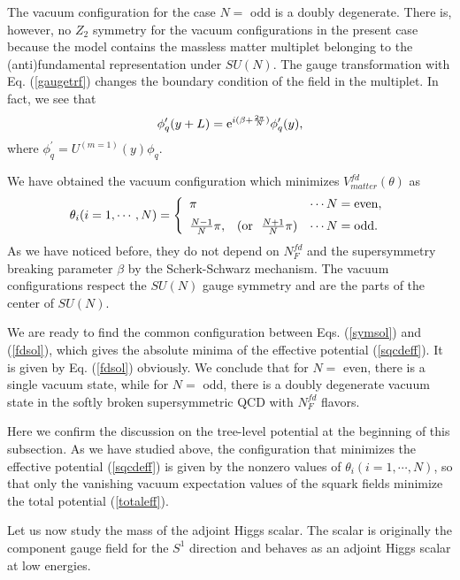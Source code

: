 \documentclass[a4paper,12pt]{article}
\begin{document}
The vacuum configuration for the case $N=$ odd is a doubly degenerate.
There is, however, no $Z_2$ symmetry for the vacuum configurations in
the present case because the model contains the massless matter 
multiplet belonging to the (anti)fundamental
representation under $SU(N)$. The gauge transformation 
with Eq. (\ref{gaugetrf})
changes the boundary condition of the field in the multiplet. 
In fact, we see that 
\begin{equation}
\phi_q^{\prime}(y+L)={\rm e}^{i(\beta+{{2\pi}\over N})}\phi_q^{\prime}(y),
\end{equation}
where $\phi_q^{\prime}=U^{(m=1)}(y)\phi_q$.
\par
We have obtained the vacuum configuration which 
minimizes $V_{matter}^{fd}(\theta)$ as
\begin{equation}
\theta_i (i=1,\cdots, N)
=\left\{\begin{array}{lcl} \pi & & \cdots N={\rm even}, \\[0.2cm]
{{N-1}\over N}\pi, & ({\rm or}~~{{N+1}\over N}\pi) &\cdots N={\rm odd}.
\end{array}\right.
\label{fdsol}
\end{equation}
As we have noticed before, they do not depend on $N_F^{fd}$ and the 
supersymmetry breaking parameter $\beta$ by 
the Scherk-Schwarz mechanism. 
The vacuum configurations 
respect the $SU(N)$ gauge symmetry and are the parts of the center
of $SU(N)$. 
\par
We are ready to find the common configuration
between Eqs. (\ref{symsol}) and (\ref{fdsol}), which gives 
the absolute minima of the effective potential (\ref{sqcdeff}).
It is given by Eq. (\ref{fdsol}) obviously.
We conclude that for $N=$ even, there is a single vacuum state, while 
for $N=$ odd, there is a doubly degenerate vacuum state 
in the softly broken supersymmetric QCD with $N_F^{fd}$ flavors. 
\par
Here we confirm the discussion on the tree-level potential 
at the beginning of this subsection. As we have studied above, the 
configuration that minimizes the effective 
potential (\ref{sqcdeff}) is given by the nonzero 
values of $\theta_i(i=1,\cdots,N)$, so that 
only the vanishing vacuum expectation values of the
squark fields minimize the total potential (\ref{totaleff}).
\par
Let us now study the mass of the adjoint Higgs scalar. The scalar
is originally the component gauge field for the $S^1$ direction 
and behaves as an adjoint Higgs scalar at low energies.
\end{document}

